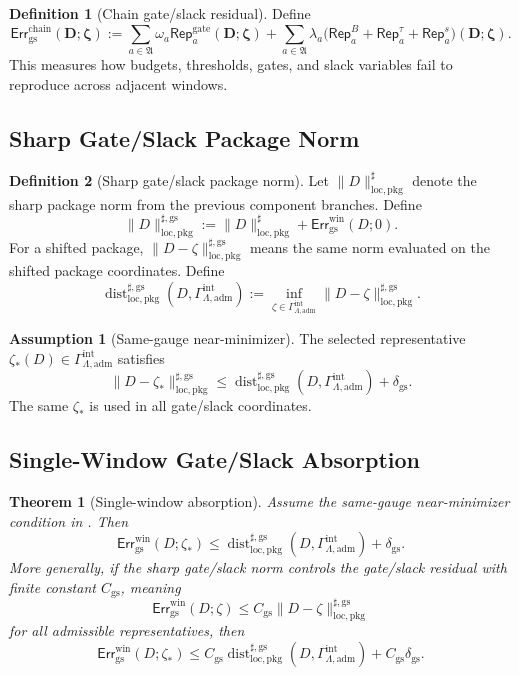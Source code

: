 \documentclass[11pt]{article}
\numberwithin{equation}{section}
\newtheorem{theorem}{Theorem}[section]
\theoremstyle{definition}
\newtheorem{definition}[definition]{Definition}
\newtheorem{assumption}[assumption]{Assumption}
\theoremstyle{remark}
\newcommand{\loc}{\mathrm{loc}}
\newcommand{\pkg}{\mathrm{pkg}}
\newcommand{\adm}{\mathrm{adm}}
\newcommand{\gs}{\mathrm{gs}}
\newcommand{\chain}{\mathrm{chain}}
\newcommand{\Err}{\mathsf{Err}}
\newcommand{\Rep}{\mathsf{Rep}}
\newcommand{\Dist}{\operatorname{dist}}
\newcommand{\bD}{\mathbf D}
\newcommand{\bzeta}{\boldsymbol\zeta}
\newcommand{\Achan}{\mathfrak A}
\newcommand{\Gint}{\Gamma_{\Lambda,\adm}^{\mathrm{int}}}
\begin{document}
\begin{definition}[Chain gate/slack residual]
\label{gs:def:chain-gs-residual}
Define
\[
    \Err_{\gs}^{\chain}(\bD;\bzeta)
    :=
    \sum_{a\in\Achan}\omega_a\Rep_a^{\mathrm{gate}}(\bD;\bzeta)
    +
    \sum_{a\in\Achan}\lambda_a
    \bigl(
        \Rep_a^B+\Rep_a^\tau+\Rep_a^s
    \bigr)(\bD;\bzeta).
\]
This measures how budgets, thresholds, gates, and slack variables fail to
reproduce across adjacent windows.
\end{definition}

\subsection{Sharp Gate/Slack Package Norm}
\label{gs:sec:single-window-norm}

\begin{definition}[Sharp gate/slack package norm]
\label{gs:def:sharp-gs-package-norm}
Let \(\|D\|_{\loc,\pkg}^{\sharp}\) denote the sharp package norm from the
previous component branches.  Define
\[
    \|D\|_{\loc,\pkg}^{\sharp,\gs}
    :=
    \|D\|_{\loc,\pkg}^{\sharp}
    +
    \Err_{\gs}^{\mathrm{win}}(D;0).
\]
For a shifted package, \(\|D-\zeta\|_{\loc,\pkg}^{\sharp,\gs}\) means the same
norm evaluated on the shifted package coordinates.  Define
\[
    \Dist_{\loc,\pkg}^{\sharp,\gs}(D,\Gint)
    :=
    \inf_{\zeta\in\Gint}
    \|D-\zeta\|_{\loc,\pkg}^{\sharp,\gs}.
\]
\end{definition}

\begin{assumption}[Same-gauge near-minimizer]
\label{gs:ass:single-window-gs-near-minimizer}
The selected representative \(\zeta_*(D)\in\Gint\) satisfies
\[
    \|D-\zeta_*\|_{\loc,\pkg}^{\sharp,\gs}
    \le
    \Dist_{\loc,\pkg}^{\sharp,\gs}(D,\Gint)
    +
    \delta_{\gs}.
\]
The same \(\zeta_*\) is used in all gate/slack coordinates.
\end{assumption}

\subsection{Single-Window Gate/Slack Absorption}
\label{gs:sec:single-window-absorption}

\begin{theorem}[Single-window absorption]
\label{gs:thm:single-window-gs-absorption-target}
Assume the same-gauge near-minimizer condition in
.  Then
\[
    \Err_{\gs}^{\mathrm{win}}(D;\zeta_*)
    \le
    \Dist_{\loc,\pkg}^{\sharp,\gs}(D,\Gint)
    +
    \delta_{\gs}.
\]
More generally, if the sharp gate/slack norm controls the gate/slack residual
with finite constant \(C_{\gs}\), meaning
\[
    \Err_{\gs}^{\mathrm{win}}(D;\zeta)
    \le
    C_{\gs}\|D-\zeta\|_{\loc,\pkg}^{\sharp,\gs}
\]
for all admissible representatives, then
\[
    \Err_{\gs}^{\mathrm{win}}(D;\zeta_*)
    \le
    C_{\gs}
    \Dist_{\loc,\pkg}^{\sharp,\gs}(D,\Gint)
    +
    C_{\gs}\delta_{\gs}.
\]
\end{theorem}
\end{document}
